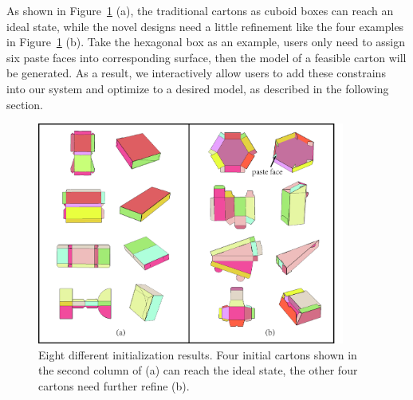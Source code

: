 As shown in Figure~\ref{fig:initial} (a), the traditional cartons as cuboid boxes can reach an ideal state, while the novel designs need a little refinement like the four examples in Figure~\ref{fig:initial} (b). Take the hexagonal box as an example, users only need to assign six paste faces into corresponding surface, then the model of a feasible carton will be generated. As a result, we interactively allow users to add these constrains into our system and optimize to a desired model, as described in the following section.

\begin{figure}
	\centering
	\includegraphics[width=0.9\textwidth]{images/initial.jpg}
	\caption{Eight different initialization results. Four initial cartons shown in the second column of (a) can reach the ideal state, the other four cartons need further refine (b).}
	\label{fig:initial}
\end{figure}


